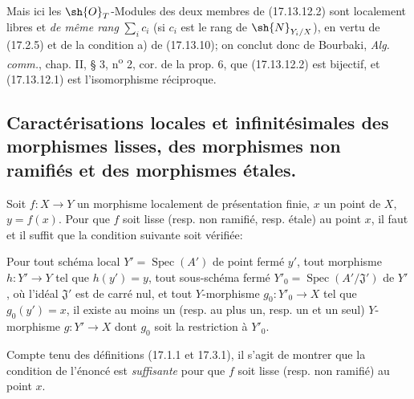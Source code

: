 
Mais ici les $\sh{O}_T$-Modules des deux membres de (17.13.12.2) sont localement libres et \emph{de même rang} $\sum_i c_i$ (si $c_i$ est le rang de $\sh{N}_{Y_i/X}$), en vertu de (17.2.5) et de la condition a) de (17.13.10); on conclut donc de Bourbaki, \emph{Alg. comm.}, chap. II, § 3, n\textsuperscript{o} 2, cor. de la prop. 6, que (17.13.12.2) est bijectif, et (17.13.12.1) est l'isomorphisme réciproque.

\subsection{Caractérisations locales et infinitésimales des morphismes lisses, des morphismes non ramifiés et des morphismes étales.}

\begin{proposition}[17.14.1]
\label{IV.17.14.1}
Soit $f:X\to Y$ un morphisme localement de présentation finie, $x$ un point de $X$, $y=f(x)$. Pour que $f$ soit lisse (resp. non ramifié, resp. étale) au point $x$, il faut et il suffit que la condition suivante soit vérifiée:

Pour tout schéma local $Y'=\operatorname{Spec}(A')$ de point fermé $y'$, tout morphisme $h:Y'\to Y$ tel que $h(y')=y$, tout sous-schéma fermé $Y'_0=\operatorname{Spec}(A'/\mathfrak{J}')$ de $Y'$, où l'idéal $\mathfrak{J}'$ est de carré nul, et tout $Y$-morphisme $g_0:Y'_0\to X$ tel que $g_0(y')=x$, il existe au moins un (resp. au plus un, resp. un et un seul) $Y$-morphisme $g:Y'\to X$ dont $g_0$ soit la restriction à $Y'_0$.
\end{proposition}

Compte tenu des définitions (17.1.1 et 17.3.1), il s'agit de montrer que la condition de l'énoncé est \emph{suffisante} pour que $f$ soit lisse (resp. non ramifié) au point $x$.

